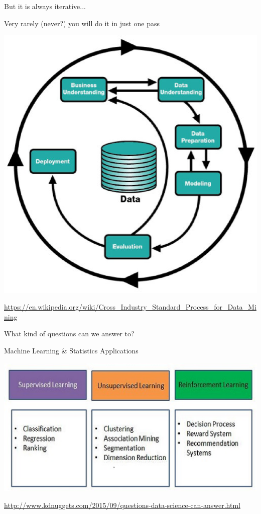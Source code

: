 \documentclass[11pt,xcolor=svgnames]{beamer}
\begin{document}
\begin{frame}{But it is always iterative...}
  \begin{block}{Very rarely (never?) you will do it in just one pass}
    \begin{center}
      \includegraphics[scale=.35]{figs/crisp-dm}
    \end{center}
  \end{block}
  \begin{tiny}
    \url{https://en.wikipedia.org/wiki/Cross_Industry_Standard_Process_for_Data_Mining}
  \end{tiny}
\end{frame}

\begin{frame}{What kind of questions can we answer to?}
  \begin{block}{Machine Learning \& Statistics Applications}
    \begin{center}
      \includegraphics[scale=.75]{figs/machine-learning-applications}
    \end{center}
  \end{block}
  \begin{tiny}
    \url{http://www.kdnuggets.com/2015/09/questions-data-science-can-answer.html}
  \end{tiny}
\end{frame}
\end{document}
